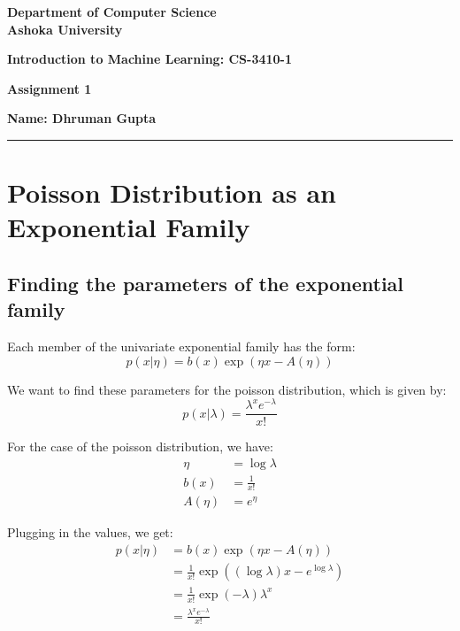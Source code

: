 \documentclass[a4paper]{article}
\begin{document}
\begin{center}
{\large \bf \color{red}  Department of Computer Science} \\
{\large \bf \color{red}  Ashoka University} \\

\vspace{0.1in}

{\large \bf \color{blue} Introduction to Machine Learning: CS-3410-1}

\vspace{0.05in}

    { \bf \color{YellowOrange} Assignment 1}
\end{center}
\medskip

{\textbf{Name: Dhruman Gupta} }

\bigskip
\hrule

\section{Poisson Distribution as an Exponential Family}
\subsection{Finding the parameters of the exponential family}
Each member of the univariate exponential family has the form:
\begin{equation*}
    p(x | \eta) = b(x) \exp(\eta x - A(\eta))
\end{equation*}

We want to find these parameters for the poisson distribution, which is given by:
\begin{equation*}
    p(x | \lambda) = \frac{\lambda^x e^{-\lambda}}{x!}
\end{equation*}

For the case of the poisson distribution, we have:
\begin{align*}
    \eta &= \log \lambda \\
    b(x) &= \frac{1}{x!} \\
    A(\eta) &= e^\eta
\end{align*}

Plugging in the values, we get:
\begin{align*}
    p(x | \eta) &= b(x) \exp(\eta x - A(\eta)) \\
    &= \frac{1}{x!} \exp((\log \lambda) x - e^{\log \lambda}) \\
    &= \frac{1}{x!} \exp(- \lambda) \lambda^x \\
    &= \frac{\lambda^x e^{-\lambda}}{x!}
\end{align*}
\end{document}
